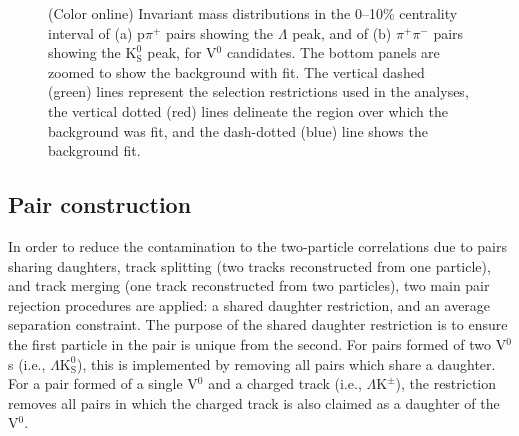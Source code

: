 \documentclass[ALICE,manyauthors]{cernphprep}
\newcommand{\Lam}{$\Lambda$\xspace}
\newcommand{\Ks}{$\mathrm{K^{0}_{S}}$\xspace}
\newcommand{\LamKpm}{$\Lambda\mathrm{K^{\pm}}$\xspace}
\newcommand{\LamKs}{$\Lambda\mathrm{K^{0}_{S}}$\xspace}
\newcommand{\Vz}{V$^{0}$\xspace}
\begin{document}
\begin{figure}[htp]
  \centering
  \caption{
  (Color online) Invariant mass distributions in the 0--10\% centrality interval of (a) p$\pi^{+}$ pairs showing the \Lam peak, and of (b) $\pi^{+}\pi^{-}$ pairs showing the \Ks peak, for \Vz candidates.  
  The bottom panels are zoomed to show the background with fit.  
  The vertical dashed (green) lines represent the selection restrictions used in the analyses, the vertical dotted (red) lines delineate the region over which the background was fit, and the dash-dotted (blue) line shows the background fit.
  }  
  \label{fig:Purity}
\end{figure}





\subsection{Pair construction}
\label{PairConstruction}

In order to reduce the contamination to the two-particle correlations due to pairs sharing daughters, track splitting (two tracks reconstructed from one particle), and track merging (one track reconstructed from two particles), two main pair rejection procedures are applied: a shared daughter restriction, and an average separation constraint.
The purpose of the shared daughter restriction is to ensure the first particle in the pair is unique from the second.  
For pairs formed of two V$^{0}$s (i.e., \LamKs), this is implemented by removing all pairs which share a daughter.  
For a pair formed of a single \Vz and a charged track (i.e., \LamKpm), the restriction removes all pairs in which the charged track is also claimed as a daughter of the \Vz.  
\end{document}

